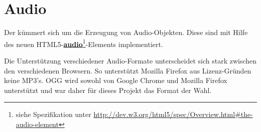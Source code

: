 \chapter{Audio}

Der  kümmert sich um die Erzeugung von Audio-Objekten. Diese sind mit Hilfe des neuen HTML5-\textbf{\href{http://dev.w3.org/html5/spec/Overview.html\#the-audio-element}{audio}}\footnote{siehe Spezifikation unter \url{http://dev.w3.org/html5/spec/Overview.html\#the-audio-element}}-Elements implementiert.

Die Unterstützung verschiedener Audio-Formate unterscheidet sich stark zwischen den verschiedenen Browsern. So unterstützt Mozilla Firefox aus Lizenz-Gründen keine MP3's. OGG wird sowohl von Google Chrome und Mozilla Firefox unterstützt und war daher für dieses Projekt das Format der Wahl.
